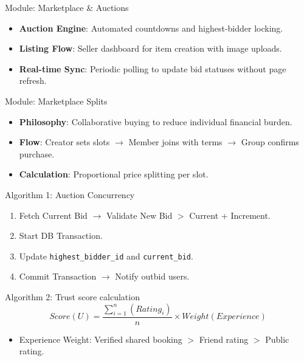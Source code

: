 \documentclass[10pt]{beamer}
\begin{document}
\begin{frame}{Module: Marketplace \& Auctions}
    \begin{itemize}
        \item \textbf{Auction Engine}: Automated countdowns and highest-bidder locking.
        \item \textbf{Listing Flow}: Seller dashboard for item creation with image uploads.
        \item \textbf{Real-time Sync}: Periodic polling to update bid statuses without page refresh.
    \end{itemize}
\end{frame}

\begin{frame}{Module: Marketplace Splits}
    \begin{itemize}
        \item \textbf{Philosophy}: Collaborative buying to reduce individual financial burden.
        \item \textbf{Flow}: Creator sets slots $\rightarrow$ Member joins with terms $\rightarrow$ Group confirms purchase.
        \item \textbf{Calculation}: Proportional price splitting per slot.
    \end{itemize}
\end{frame}

\begin{frame}{Algorithm 1: Auction Concurrency}
    \begin{enumerate}
        \item Fetch Current Bid $\rightarrow$ Validate New Bid $>$ Current + Increment.
        \item Start DB Transaction.
        \item Update \texttt{highest\_bidder\_id} and \texttt{current\_bid}.
        \item Commit Transaction $\rightarrow$ Notify outbid users.
    \end{enumerate}
\end{frame}

\begin{frame}{Algorithm 2: Trust score calculation}
    \begin{equation}
        Score(U) = \frac{\sum_{i=1}^{n} (Rating_i)}{n} \times Weight(Experience)
    \end{equation}
    \begin{itemize}
        \item Experience Weight: Verified shared booking $>$ Friend rating $>$ Public rating.
    \end{itemize}
\end{frame}
\end{document}
